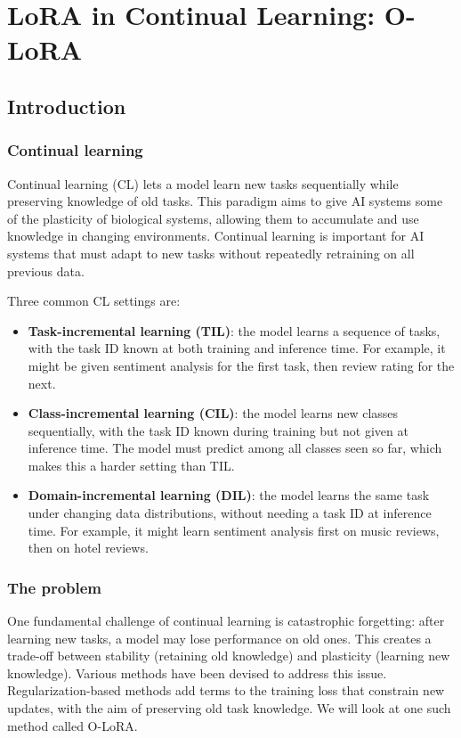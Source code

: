 \section{LoRA in Continual Learning: O-LoRA}
\subsection{Introduction}
\subsubsection{Continual learning}
Continual learning (CL) lets a model learn new tasks sequentially while preserving knowledge of old tasks. This paradigm aims to give AI systems some of the plasticity of biological systems, allowing them to accumulate and use knowledge in changing environments. Continual learning is important for AI systems that must adapt to new tasks without repeatedly retraining on all previous data.

Three common CL settings are:
\begin{itemize}
    \item \textbf{Task-incremental learning (TIL)}: the model learns a sequence of tasks, with the task ID known at both training and inference time. For example, it might be given sentiment analysis for the first task, then review rating for the next.
    \item \textbf{Class-incremental learning (CIL)}: the model learns new classes sequentially, with the task ID known during training but not given at inference time. The model must predict among all classes seen so far, which makes this a harder setting than TIL.
    \item \textbf{Domain-incremental learning (DIL)}: the model learns the same task under changing data distributions, without needing a task ID at inference time. For example, it might learn sentiment analysis first on music reviews, then on hotel reviews.
\end{itemize}

\subsubsection{The problem}
One fundamental challenge of continual learning is catastrophic forgetting: after learning new tasks, a model may lose performance on old ones. This creates a trade-off between stability (retaining old knowledge) and plasticity (learning new knowledge). Various methods have been devised to address this issue. Regularization-based methods add terms to the training loss that constrain new updates, with the aim of preserving old task knowledge. We will look at one such method called O-LoRA.

